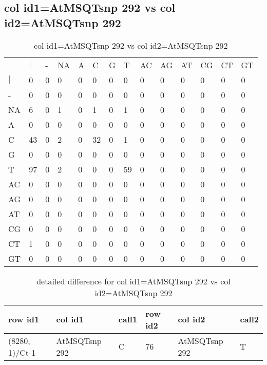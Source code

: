\subsection{col id1=AtMSQTsnp 292 vs col id2=AtMSQTsnp 292}
\begin{center}
\begin{longtable}{|l|l|l|l|l|l|l|l|l|l|l|l|l|l|}
\caption{col id1=AtMSQTsnp 292 vs col id2=AtMSQTsnp 292} \label{table_dm640}\\
\hline
\\
\hline
&$|$&-&NA&A&C&G&T&AC&AG&AT&CG&CT&GT\\
$|$&0&0&0&0&0&0&0&0&0&0&0&0&0\\
-&0&0&0&0&0&0&0&0&0&0&0&0&0\\
NA&6&0&1&0&1&0&1&0&0&0&0&0&0\\
A&0&0&0&0&0&0&0&0&0&0&0&0&0\\
C&43&0&2&0&32&0&1&0&0&0&0&0&0\\
G&0&0&0&0&0&0&0&0&0&0&0&0&0\\
T&97&0&2&0&0&0&59&0&0&0&0&0&0\\
AC&0&0&0&0&0&0&0&0&0&0&0&0&0\\
AG&0&0&0&0&0&0&0&0&0&0&0&0&0\\
AT&0&0&0&0&0&0&0&0&0&0&0&0&0\\
CG&0&0&0&0&0&0&0&0&0&0&0&0&0\\
CT&1&0&0&0&0&0&0&0&0&0&0&0&0\\
GT&0&0&0&0&0&0&0&0&0&0&0&0&0\\
\hline
\end{longtable}
\end{center}

\begin{center}
\begin{longtable}{|l|l|l|l|l|l|}
\caption{detailed difference for col id1=AtMSQTsnp 292 vs col id2=AtMSQTsnp 292} \label{table_dm641}\\
\hline
row id1&col id1&call1&row id2&col id2&call2\\
\hline
(8280, 1)/Ct-1&AtMSQTsnp 292&C&76&AtMSQTsnp 292&T\\
\hline
\end{longtable}
\end{center}

